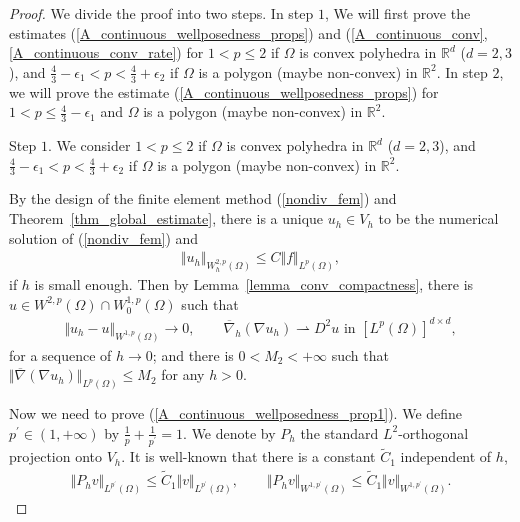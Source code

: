\documentclass[10pt,a4paper]{amsart}
\begin{document}
\begin{proof}
We divide the proof into two steps. In step $1$,
We will first prove the estimates (\ref{A_continuous_wellposedness_props}) 
and (\ref{A_continuous_conv},\ref{A_continuous_conv_rate}) for 
 $1< p \leq 2$ if $\Omega$ is convex polyhedra in $\mathbb{R}^{d}$ ($d=2,3$), and 
 $ \frac{4}{3} - \epsilon_{1} <p < \frac{4}{3} 
+ \epsilon_{2}$ if $\Omega$ is a polygon (maybe non-convex) in $\mathbb{R}^{2}$. 
In step $2$, we will prove the estimate (\ref{A_continuous_wellposedness_props}) 
for $1< p \leq \frac{4}{3} - \epsilon_{1}$ and $\Omega$ is a 
polygon (maybe non-convex) in $\mathbb{R}^{2}$. 

Step $1$. We consider $1< p \leq 2$ if $\Omega$ is convex polyhedra in $\mathbb{R}^{d}$ ($d=2,3$), and $ \frac{4}{3} - \epsilon_{1} <p < \frac{4}{3} 
+ \epsilon_{2}$ if $\Omega$ is a polygon (maybe non-convex) in $\mathbb{R}^{2}$.

By the design of the finite element method (\ref{nondiv_fem}) and 
Theorem~\ref{thm_global_estimate}, there is a unique $u_{h} \in V_{h}$ 
to be the numerical solution of (\ref{nondiv_fem}) and 
\begin{align*}
\Vert u_{h} \Vert_{W_{h}^{2,p}(\Omega)} \leq C \Vert f\Vert_{L^{p}(\Omega)},
\end{align*}
if $h$ is small enough. Then by Lemma~\ref{lemma_conv_compactness}, there is 
$u \in W^{2,p}(\Omega) \cap W_{0}^{1,p}(\Omega)$ such that 
\begin{align*}
\Vert u_{h} - u\Vert_{W^{1,p}(\Omega)} \rightarrow 0, \qquad 
\overline{\nabla}_{h}(\nabla u_{h}) \rightharpoonup D^{2}u 
\text{ in } [L^{p}(\Omega)]^{d \times d},
\end{align*}
for a sequence of $h \rightarrow 0$; and there is $0 < M_{2} < +\infty$ such that 
$\Vert \overline{\nabla}(\nabla u_{h})\Vert_{L^{p}(\Omega)} \leq M_{2}$ for any 
$h > 0$.

Now we need to prove (\ref{A_continuous_wellposedness_prop1}). 
We define $p^{\prime} \in (1, + \infty)$ by  $\frac{1}{p} + \frac{1}{p^{\prime}} = 1$. 
We denote by $P_{h}$ the standard $L^{2}$-orthogonal projection onto $V_{h}$.
It is well-known that there is a constant $\tilde{C}_{1}$ independent of $h$, 
\begin{align}
\label{L2_projection_bound3}
\Vert P_{h} v\Vert_{L^{p^{\prime}}(\Omega)} \leq \tilde{C}_{1} \Vert v\Vert_{L^{p^{\prime}}(\Omega)}, 
\qquad \Vert P_{h} v\Vert_{W^{1,p^{\prime}}(\Omega)} \leq \tilde{C}_{1} \Vert v\Vert_{W^{1,p^{\prime}}(\Omega)}.
\end{align}


\end{proof}
\end{document}
